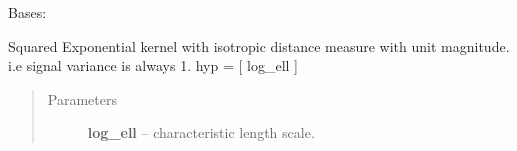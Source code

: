 \documentclass[letterpaper,10pt,english]{sphinxmanual}
\begin{document}
\begin{fulllineitems}
\label{pyGPs.Core:pyGPs.Core.cov.RBFunit}
Bases: 

Squared Exponential kernel with isotropic distance measure with unit magnitude.
i.e signal variance is always 1. hyp = {[} log\_ell {]}
\begin{quote}\begin{description}
\item[{Parameters}] \leavevmode
\textbf{log\_ell} -- characteristic length scale.

\end{description}\end{quote}

\begin{fulllineitems}
\label{pyGPs.Core:pyGPs.Core.cov.RBFunit.getCovMatrix}
\end{fulllineitems}


\begin{fulllineitems}
\label{pyGPs.Core:pyGPs.Core.cov.RBFunit.getDerMatrix}
\end{fulllineitems}


\end{fulllineitems}

\end{document}
